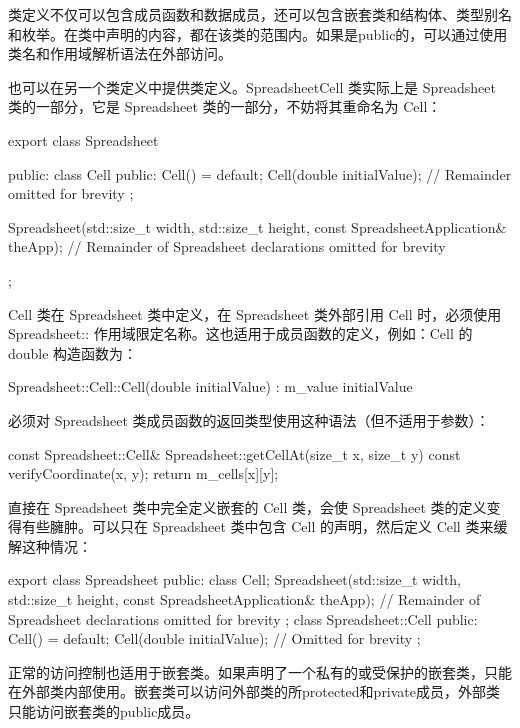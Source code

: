类定义不仅可以包含成员函数和数据成员，还可以包含嵌套类和结构体、类型别名和枚举。在类中声明的内容，都在该类的范围内。如果是public的，可以通过使用类名和作用域解析语法在外部访问。

也可以在另一个类定义中提供类定义。SpreadsheetCell 类实际上是 Spreadsheet 类的一部分，它是 Spreadsheet 类的一部分，不妨将其重命名为 Cell：

\begin{cpp}
export class Spreadsheet
{
    public:
        class Cell
        {
            public:
                Cell() = default;
                Cell(double initialValue);
                // Remainder omitted for brevity
        };

        Spreadsheet(std::size_t width, std::size_t height,
            const SpreadsheetApplication& theApp);
        // Remainder of Spreadsheet declarations omitted for brevity
};
\end{cpp}

Cell 类在 Spreadsheet 类中定义，在 Spreadsheet 类外部引用 Cell 时，必须使用 Spreadsheet:: 作用域限定名称。这也适用于成员函数的定义，例如：Cell 的 double 构造函数为：

\begin{cpp}
Spreadsheet::Cell::Cell(double initialValue)
    : m_value { initialValue }
{}
\end{cpp}

必须对 Spreadsheet 类成员函数的返回类型使用这种语法（但不适用于参数）：

\begin{cpp}
const Spreadsheet::Cell& Spreadsheet::getCellAt(size_t x, size_t y) const
{
    verifyCoordinate(x, y);
    return m_cells[x][y];
}
\end{cpp}

直接在 Spreadsheet 类中完全定义嵌套的 Cell 类，会使 Spreadsheet 类的定义变得有些臃肿。可以只在 Spreadsheet 类中包含 Cell 的声明，然后定义 Cell 类来缓解这种情况：

\begin{cpp}
export class Spreadsheet
{
    public:
        class Cell;
        Spreadsheet(std::size_t width, std::size_t height,
            const SpreadsheetApplication& theApp);
        // Remainder of Spreadsheet declarations omitted for brevity
};
class Spreadsheet::Cell
{
    public:
        Cell() = default;
        Cell(double initialValue);
        // Omitted for brevity
};
\end{cpp}

正常的访问控制也适用于嵌套类。如果声明了一个私有的或受保护的嵌套类，只能在外部类内部使用。嵌套类可以访问外部类的所protected和private成员，外部类只能访问嵌套类的public成员。











